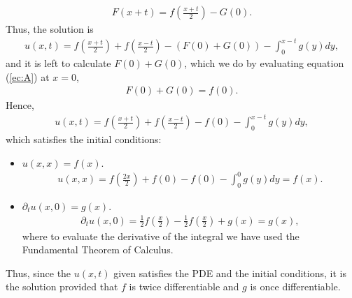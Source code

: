 \begin{questions}
\begin{solution}
\begin{align*}
F(x+t)=f(\frac{x+t}{2})-G(0).
\end{align*}
Thus, the solution is
\begin{align*}
u(x,t)=f(\frac{x+t}{2})+f(\frac{x-t}{2})-\left(F(0)+G(0)\right)-\int_0^{x-t}g(y)dy,
\end{align*}
and it is left to calculate $F(0)+G(0)$, which we do by evaluating equation (\ref{ec:A}) at $x=0$,
\begin{align*}
F(0)+G(0)=f(0).
\end{align*}
Hence,
\begin{align*}
u(x,t)=f(\frac{x+t}{2})+f(\frac{x-t}{2})-f(0)-\int_0^{x-t}g(y)dy,
\end{align*}
which satisfies the initial conditions:
\begin{itemize}
\item $u(x,x)=f(x).$
\begin{align*}
u(x,x)=f(\frac{2x}{2})+f(0)-f(0)-\int_0^{0}g(y)dy=f(x).
\end{align*}
\item $\partial_tu(x,0)=g(x).$
\begin{align*}
\partial_tu(x,0)=\frac{1}{2}f(\frac{x}{2})-\frac{1}{2}f(\frac{x}{2})+g(x)=g(x),
\end{align*}
where to evaluate the derivative of the integral we have used the Fundamental Theorem of Calculus.
\end{itemize}
Thus, since the $u(x,t)$ given satisfies the PDE and the initial conditions, it is the solution provided that $f$ is twice differentiable and $g$ is once differentiable.
\end{solution}

\end{questions}
